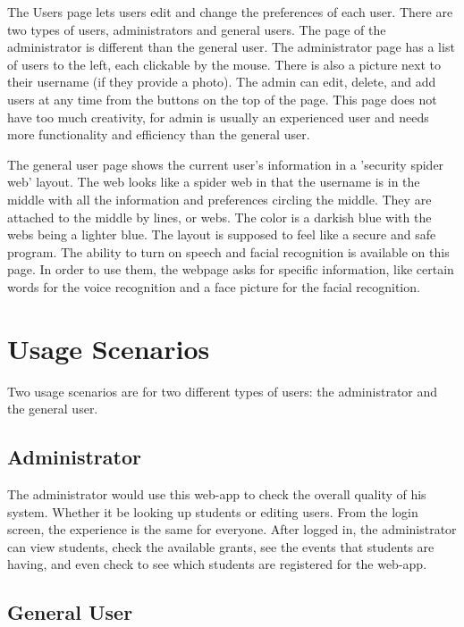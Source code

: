 \documentclass{article}
\begin{document}
The Users page lets users edit and change the preferences of each user.  There are two types of users, administrators and general users.  The page of the administrator is different than the general user.  The administrator page has a list of users to the left, each clickable by the mouse.  There is also a picture next to their username (if they provide a photo).  The admin can edit, delete, and add users at any time from the buttons on the top of the page.  This page does not have too much creativity, for admin is usually an experienced user and needs more functionality and efficiency than the general user.  

The general user page shows the current user's information in a 'security spider web' layout.  The web looks like a spider web in that the username is in the middle with all the information and preferences circling the middle.  They are attached to the middle by lines, or webs.  The color is a darkish blue with the webs being a lighter blue.  The layout is supposed to feel like a secure and safe program.  The ability to turn on speech and facial recognition is available on this page.  In order to use them, the webpage asks for specific information, like certain words for the voice recognition and a face picture for the facial recognition. 

\section{Usage Scenarios}

Two usage scenarios are for two different types of users: the administrator and the general user.

\subsection{Administrator}

The administrator would use this web-app to check the overall quality of his system.  Whether it be looking up students or editing users.  From the login screen, the experience is the same for everyone.  After logged in, the administrator can view students, check the available grants, see the events that students are having, and even check to see which students are registered for the web-app. 

\subsection{General User}
\end{document}
